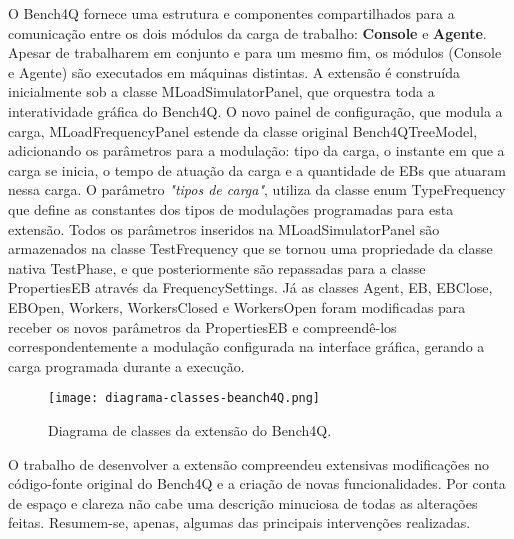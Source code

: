 O Bench4Q fornece uma estrutura e componentes compartilhados para a comunicação entre os dois módulos da carga de trabalho: \textbf{Console} e \textbf{Agente}. Apesar de trabalharem em conjunto e para um mesmo fim, os módulos (Console e Agente) são executados em máquinas distintas.  A extensão é construída inicialmente sob a classe \textsf{MLoadSimulatorPanel}, que orquestra toda a interatividade gráfica do Bench4Q. O novo painel de configuração, que modula a carga, \textsf{MLoadFrequencyPanel} estende da classe original \textsf{Bench4QTreeModel}, adicionando os parâmetros para a modulação: tipo da carga, o instante em que a carga se inicia, o tempo de atuação da carga e a quantidade de EBs que atuaram nessa carga. O parâmetro \textit{"tipos de carga"}, utiliza da classe enum \textsf{TypeFrequency} que define as constantes dos tipos de modulações programadas para esta extensão.  Todos os parâmetros inseridos na \textsf{MLoadSimulatorPanel} são armazenados na classe \textsf{TestFrequency} que se tornou uma propriedade da classe nativa \textsf{TestPhase}, e que posteriormente são repassadas para a classe \textsf{PropertiesEB} através da \textsf{FrequencySettings}. Já as classes \textsf{Agent}, \textsf{EB}, \textsf{EBClose}, \textsf{EBOpen}, \textsf{Workers}, \textsf{WorkersClosed} e \textsf{WorkersOpen} foram modificadas para receber os novos parâmetros da \textsf{PropertiesEB} e compreendê-los correspondentemente a modulação configurada na interface gráfica, gerando a carga programada durante a execução.

\begin{figure}[!htb]
	\centering
	\texttt{[image: diagrama-classes-beanch4Q.png]}	
	\caption{Diagrama de classes da extensão do Bench4Q.}
	\label{fig:diagrama-classes}
	\fautor
\end{figure}

O trabalho de desenvolver a extensão compreendeu extensivas modificações no código-fonte original do Bench4Q e a criação de novas funcionalidades. Por conta de espaço e clareza não cabe uma descrição minuciosa de todas as alterações feitas. Resumem-se, apenas, algumas das principais intervenções realizadas.


